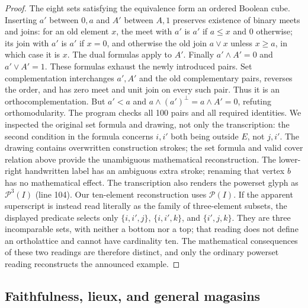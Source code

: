 \begin{proof}
The eight sets satisfying the equivalence form an ordered Boolean
cube. Inserting $a'$ between $0,a$ and $A'$ between $A,1$ preserves
existence of binary meets and joins: for an old element $x$, the meet
with $a'$ is $a'$ if $a\leq x$ and $0$ otherwise; its join with
$a'$ is $a'$ if $x=0$, and otherwise the old join $a\vee x$ unless
$x\geq a$, in which case it is $x$. The dual formulas apply to $A'$.
Finally $a'\wedge A'=0$ and $a'\vee A'=1$. These formulas exhaust
the newly introduced pairs. Set complementation interchanges
$a',A'$ and the old complementary pairs, reverses the order, and
has zero meet and unit join on every such pair. Thus it is an
orthocomplementation.
But $a'<a$ and $a\wedge(a')^\perp=a\wedge A'=0$, refuting
orthomodularity. The program checks all 100 pairs and all required
identities. We inspected the original set formula and drawing, not
only the transcription: the second condition in the formula concerns
$i,i'$ both being outside $E$, not $j,i'$. The drawing contains
overwritten construction strokes; the set formula and valid cover
relation above provide the unambiguous mathematical reconstruction.
The lower-right handwritten label has an ambiguous extra stroke;
renaming that vertex $b$ has no mathematical effect.
The transcription also renders the powerset glyph as
$\mathcal P^3(I)$ (line 104). Our ten-element reconstruction uses
$\mathcal P(I)$. If the apparent superscript is instead read literally
as the family of three-element subsets, the displayed predicate selects
only $\{i,i',j\}$, $\{i,i',k\}$, and $\{i',j,k\}$.
They are three incomparable sets, with neither a bottom nor a top;
that reading does not define an ortholattice and cannot have cardinality
ten. The mathematical consequences of these two readings are therefore
distinct, and only the ordinary powerset reading reconstructs the
announced example.
\end{proof}

\subsection{Faithfulness, lieux, and general magasins}

